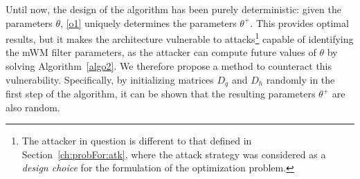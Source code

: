 Until now, the design of the algorithm has been purely deterministic: given the parameters $\theta$, \eqref{o1} uniquely determines the parameters $\theta^+$.
This provides optimal results, but it makes the architecture vulnerable to attacks\footnote{The attacker in question is different to that defined in Section~\ref{ch:probFor:atk}, where the attack strategy was considered as a \textit{design choice} for the formulation of the optimization problem.} capable of identifying the mWM filter parameters, as the attacker can compute future values of $\theta$ by solving Algorithm~\ref{algo2}.
We therefore propose a method to counteract this vulnerability. %
%
Specifically, by initializing matrices $D_q$ and $D_h$ randomly in the first step of the algorithm, it can be shown that the resulting parameters $\theta^+$ are also random.

